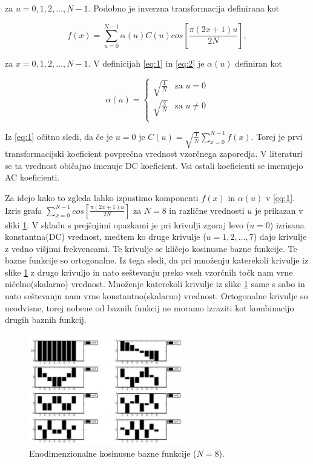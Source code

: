\documentclass[a4paper, 12pt]{book}
\begin{document}
za \(u = 0,1,2,\ldots,N-1\). Podobno je inverzna transformacija definirana kot 

\begin{equation}
f(x) = \sum_{u=0}^{N-1} \alpha(u)C(u)cos[\frac{\pi(2x+1)u}{2N}],  
\label{eq:2}
\end{equation}

za \(x = 0,1,2,\ldots,N-1\). V definicijah \ref{eq:1} in \ref{eq:2} je \(\alpha(u)\) definiran kot 

\begin{equation}
\alpha(u)=
    \begin{cases}
          \sqrt{\frac{1}{N}} & \text{za $u=0$} \\
          \sqrt{\frac{2}{N}} & \text{za $u\neq 0$} \\
    \end{cases}
\label{eq:3}
\end{equation}

Iz \ref{eq:1} očitno sledi, da če je \(u = 0\) je 
\(C(u) = \sqrt{\frac{1}{N}} \sum_{x=0}^{N-1} f(x)\). Torej je prvi transformacijski koeficient povprečna vrednost vzorčnega zaporedja. V literaturi se ta vrednost običajno imenuje DC koeficient. Vsi ostali koeficienti se imenujejo AC koeficienti. \par
Za idejo kako to zgleda lahko izpustimo komponenti \(f(x)\) in \(\alpha(u)\) v \ref{eq:1}. Izris grafa  \(\sum_{x=0}^{N-1}cos[\frac{\pi(2x+1)u}{2N}]\) za \(N=8\) in različne vrednosti \(u\) je prikazan v sliki \ref{pic1}. V skladu s prejšnjimi opazkami je pri krivulji zgoraj levo (\(u=0\)) izrisana konstantna(DC) vrednost, medtem ko druge krivulje (\(u=1,2,\ldots,7\)) dajo krivulje z vedno višjimi frekvencami. Te krivulje se kličejo kosinusne bazne funkcije. Te bazne funkcije so ortogonalne. Iz tega sledi, da pri množenju katerekoli krivulje iz slike \ref{pic1} z drugo krivuljo in nato seštevanju preko vseh vzorčnih točk nam vrne ničelno(skalarno) vrednost. Množenje katerekoli krivulje iz slike \ref{pic1} same s sabo in nato seštevanju nam vrne konstantno(skalarno) vrednost. Ortogonalne krivulje so neodvisne, torej nobene od baznih funkcij ne moramo izraziti kot kombinacijo drugih baznih funkcij.

\begin{figure}[h]
\begin{center}
\includegraphics[width=0.6\textwidth]{slike/slika_1.pdf}
\end{center}
\caption{Enodimenzionalne kosinusne bazne funkcije (\(N=8\)).}
\label{pic1}
\end{figure}
\end{document}
